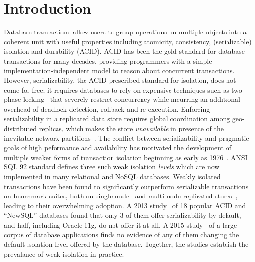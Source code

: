 \section{Introduction}

Database transactions allow users to group operations on multiple
objects into a coherent unit with useful properties including
atomicity, consistency, (serializable) isolation and durability
(ACID). ACID has been the gold standard for database transactions for
many decades, providing programmers with a simple
implementation-independent model to reason about concurrent
transactions. However, serializability, the ACID-prescribed standard for
isolation, does not come for free; it requires databases to rely on
expensive techniques such as two-phase locking~\cite{twopl,ullmanbook}
that severely restrict concurrency while incurring an additional
overhead of deadlock detection, rollback and re-execution. Enforcing
serializability in a replicated data store requires global
coordination among geo-distributed replicas, which makes the store
\emph{unavailable} in presence of the inevitable network
partitions~\cite{cap,sernotavlbl,bailishat,bernsigmod13}. The
conflict between serializability and pragmatic goals of high
peformance and availability has motivated the development of multiple
weaker forms of transaction isolation beginning as early as
1976~\cite{gray1976}. ANSI SQL 92 standard defines three such weak
isolation \emph{levels} which are now implemented in
many relational and NoSQL databases. Weakly isolated transactions have
been found to significantly outperform serializable transactions on
benchmark suites, both on single-node~\cite{dbtuningbook} and
multi-node replicated stores~\cite{bailishat,bailisvldb}, leading to
their overwhelming adoption. A 2013 study~\cite{bailishotos} of 18
popular ACID and ``NewSQL'' databases found that only 3 of them offer
serializability by default, and half, including Oracle 11g, do not
offer it at all.  A 2015 study~\cite{bailisferal} of a large corpus of
database applications finds no evidence of any of them changing the
default isolation level offered by the database. Together, the studies
establish the prevalance of weak isolation in practice.

